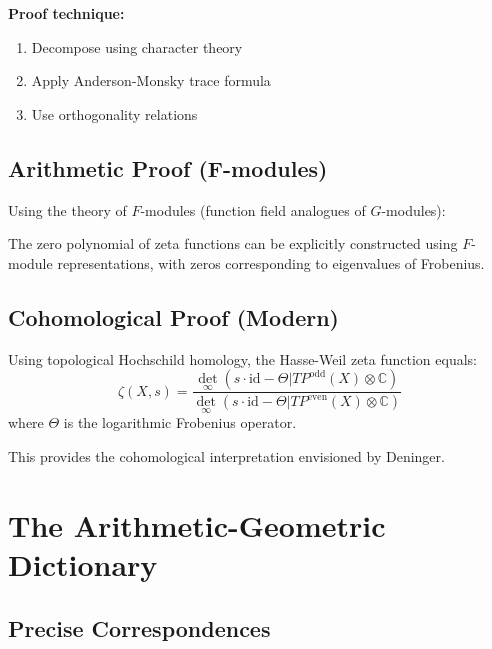 \textbf{Proof technique:}
\begin{enumerate}
\item Decompose using character theory
\item Apply Anderson-Monsky trace formula
\item Use orthogonality relations
\end{enumerate}

\subsection{Arithmetic Proof (F-modules)}

Using the theory of $F$-modules (function field analogues of $G$-modules):

\begin{theorem}
The zero polynomial of zeta functions can be explicitly constructed using $F$-module representations, with zeros corresponding to eigenvalues of Frobenius.
\end{theorem}

\subsection{Cohomological Proof (Modern)}

\begin{theorem}[Hesselholt, 2016]
Using topological Hochschild homology, the Hasse-Weil zeta function equals:
\begin{equation}
\zeta(X,s) = \frac{\det_{\infty}(s \cdot \text{id} - \Theta | TP^{\text{odd}}(X) \otimes \mathbb{C})}{\det_{\infty}(s \cdot \text{id} - \Theta | TP^{\text{even}}(X) \otimes \mathbb{C})}
\end{equation}
where $\Theta$ is the logarithmic Frobenius operator.
\end{theorem}

This provides the cohomological interpretation envisioned by Deninger.

\section{The Arithmetic-Geometric Dictionary}
\label{sec:dictionary}

\subsection{Precise Correspondences}


